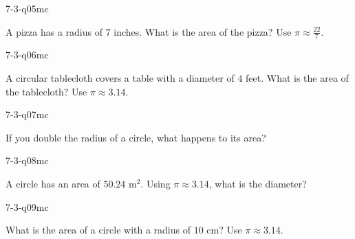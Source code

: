 \begin{practiceQuestion}{7-3-q05}{mc}
\begin{questionText}
A pizza has a radius of $7$ inches. What is the area of the pizza? Use $\pi \approx \frac{22}{7}$.
\end{questionText}
\end{practiceQuestion}

\begin{practiceQuestion}{7-3-q06}{mc}
\begin{questionText}
A circular tablecloth covers a table with a diameter of $4$ feet. What is the area of the tablecloth? Use $\pi \approx 3.14$.
\end{questionText}
\end{practiceQuestion}

\begin{practiceQuestion}{7-3-q07}{mc}
\begin{questionText}
If you double the radius of a circle, what happens to its area?
\end{questionText}
\end{practiceQuestion}

\begin{practiceQuestion}{7-3-q08}{mc}
\begin{questionText}
A circle has an area of $50.24$ m$^2$. Using $\pi \approx 3.14$, what is the diameter?
\end{questionText}
\end{practiceQuestion}

\begin{practiceQuestion}{7-3-q09}{mc}
\begin{questionText}
What is the area of a circle with a radius of $10$ cm? Use $\pi \approx 3.14$.
\end{questionText}
\end{practiceQuestion}

